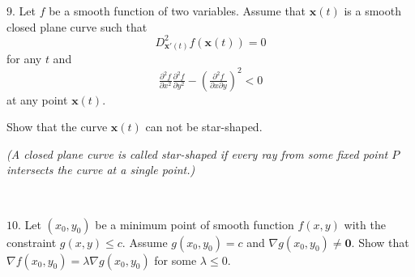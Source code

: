 \documentclass{article}
\def\noi{\noindent}%
\def\le{\leqslant}%
\begin{document}
\noi
$9$. Let $f$ be a smooth function of two variables. 
Assume that $\textbf{x}(t)$ is a smooth closed plane curve such that 
\[D^2_{\textbf{x}'(t)}f(\textbf{x}(t))=0\]
for any $t$ and
\[\tfrac{\partial^2 f}{\partial x^2}\tfrac{\partial^2 f}{\partial y^2}-(\tfrac{\partial^2 f}{\partial x\partial y})^2<0\]
at any point $\textbf{x}(t)$.

Show that the curve $\textbf{x}(t)$ can not be star-shaped.

\emph{(A closed plane curve is called star-shaped if every ray from some fixed point $P$ intersects the curve at a single point.)}

\ 

\noi
$10$. Let $(x_0,y_0)$ be a minimum point of smooth function $f(x,y)$ with the constraint $g(x,y)\le c$.
Assume $g(x_0,y_0)=c$ and $\nabla g(x_0,y_0)\ne \textbf{0}$.
Show that  
$\nabla f(x_0,y_0)=\lambda \nabla g(x_0,y_0)$
for some $\lambda\le 0$.
\end{document}
